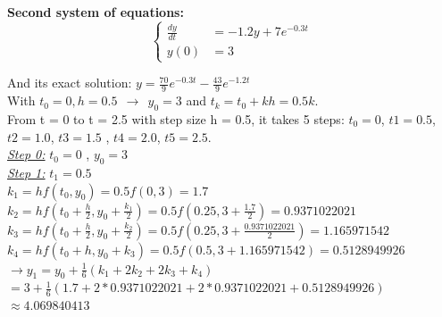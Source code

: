 \documentclass[a4paper]{article}
\numberwithin{equation}{section}
\begin{document}
\textbf{Second system of equations:}
\begin{equation*}
  \begin{cases}
    \frac{dy}{dt} & = -1.2y + 7e^{-0.3t}  \\
    y(0)          & = 3
  \end{cases}
\end{equation*}

And its exact solution:
   $y = \frac{70}{9}e^{-0.3t}-\frac{43}{9}e^{-1.2t}$\\
With \(t_0 = 0, h=0.5 ~~\rightarrow ~~ y_0 = 3\) and \(t_k = t_0 + kh = 0.5k\).\\

From t = 0 to t = 2.5 with step size h = 0.5, it takes 5 steps: \(t_0 = 0\), \(t1 = 0.5\), \(t2 = 1.0\), \(t3 = 1.5\) , \(t4 = 2.0\), \(t5 = 2.5\).\\

\underline{\textit{Step 0:}} \(t_0=0\) , \(y_0=3\) \\

\underline{\textit{Step 1:}} \(t_1=0.5\)\\

  $k_1 = hf(t_0, y_0) = 0.5f(0, 3) = 1.7$\\
  
  $k_2 = hf\left(t_0 + \frac{h}{2}, y_0 + \frac{k_1}{2}\right) = 0.5f(0.25, 3 + \frac{1.7}{2}) = 0.9371022021$\\
  
  $k_3 = hf\left(t_0 + \frac{h}{2}, y_0 + \frac{k_2}{2}\right) = 0.5f(0.25, 3 + \frac{0.9371022021}{2}) = 1.165971542$\\
  
  $k_4 = hf(t_0 + h, y_0 + k_3) = 0.5f(0.5, 3+ 1.165971542) = 0.5128949926$\\
  
  $\rightarrow y_1 = y_0 + \frac{1}{6}(k_1 + 2k_2 + 2k_3 + k_4)$\\
  
  $= 3 + \frac{1}{6} (1.7 + 2*0.9371022021 + 2*0.9371022021 + 0.5128949926)$\\   
  $\approx 4.069840413$\\
\end{document}
